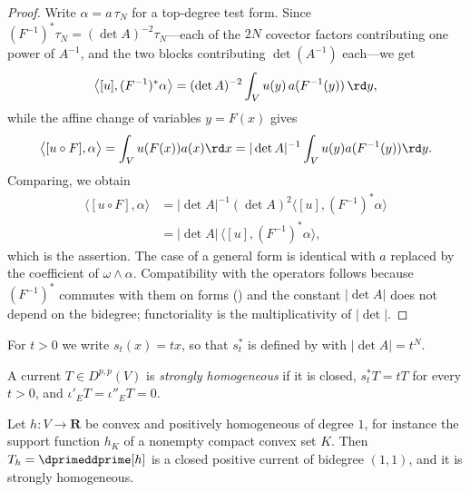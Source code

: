 \begin{proof}
Write $\alpha=a\,\tau_N$ for a top-degree test form.  Since
$(F^{-1})^*\tau_N=(\det A)^{-2}\tau_N$---each of the $2N$ covector factors
contributing one power of $A^{-1}$, and the two blocks contributing
$\det(A^{-1})$ each---we get
\[
 \bigl\langle[u],(F^{-1})^*\alpha\bigr\rangle
 =(\det A)^{-2}\int_Vu(y)\,a(F^{-1}(y))\,\rd y ,
\]
while the affine change of variables $y=F(x)$ gives
\[
 \bigl\langle[u\circ F],\alpha\bigr\rangle
 =\int_Vu(F(x))a(x)\rd x
 =|\det A|^{-1}\int_Vu(y)a(F^{-1}(y))\rd y .
\]
Comparing, we obtain
\[
 \begin{aligned}
  \langle[u\circ F],\alpha\rangle
   &=|\det A|^{-1}(\det A)^{2}
     \langle[u],(F^{-1})^*\alpha\rangle\\
   &=|\det A|\,\langle[u],(F^{-1})^*\alpha\rangle,
 \end{aligned}
\]
which is the assertion.  The
case of a general form is identical with $a$ replaced by the coefficient of
$\omega\wedge\alpha$.  Compatibility with the operators follows because
$(F^{-1})^*$ commutes with them on forms
() and the constant $|\det A|$ does not
depend on the bidegree; functoriality is the multiplicativity of
$|\det|$.
\end{proof}

For $t>0$ we write $s_t(x)=tx$, so that $s_t^*$ is defined by
 with $|\det A|=t^{N}$.

\begin{definition}
\label{def:ch14-strongly-homogeneous}
A current $T\in D^{p,p}(V)$ is \emph{strongly homogeneous} if it is closed,
$s_t^*T=tT$ for every $t>0$, and $\iota'_ET=\iota''_ET=0$.
\end{definition}

\begin{proposition}
\label{prop:ch14-strongly-homogeneous}
Let $h:V\to\mathbf R$ be convex and positively homogeneous of degree $1$, for
instance the support function $h_K$ of a nonempty compact convex set $K$.
Then $T_h=\dprimeddprime[h]$ is a closed positive current of bidegree
$(1,1)$, and it is strongly homogeneous.
\end{proposition}


